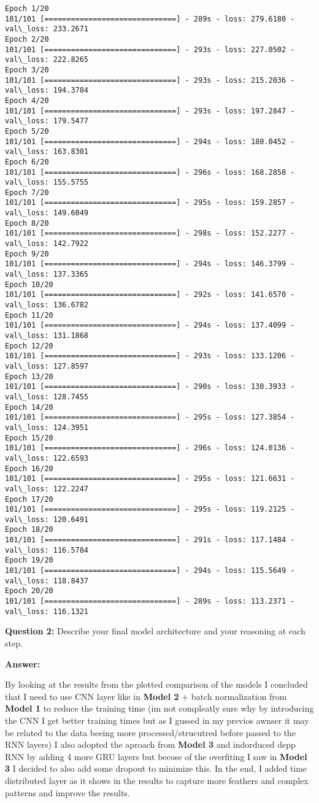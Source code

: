 \documentclass[11pt]{article}
\begin{document}
    \begin{Verbatim}[commandchars=\\\{\}]
Epoch 1/20
101/101 [==============================] - 289s - loss: 279.6180 - val\_loss: 233.2671
Epoch 2/20
101/101 [==============================] - 293s - loss: 227.0502 - val\_loss: 222.8265
Epoch 3/20
101/101 [==============================] - 293s - loss: 215.2036 - val\_loss: 194.3784
Epoch 4/20
101/101 [==============================] - 293s - loss: 197.2847 - val\_loss: 179.5477
Epoch 5/20
101/101 [==============================] - 294s - loss: 180.0452 - val\_loss: 163.8301
Epoch 6/20
101/101 [==============================] - 296s - loss: 168.2858 - val\_loss: 155.5755
Epoch 7/20
101/101 [==============================] - 295s - loss: 159.2857 - val\_loss: 149.6049
Epoch 8/20
101/101 [==============================] - 298s - loss: 152.2277 - val\_loss: 142.7922
Epoch 9/20
101/101 [==============================] - 294s - loss: 146.3799 - val\_loss: 137.3365
Epoch 10/20
101/101 [==============================] - 292s - loss: 141.6570 - val\_loss: 136.6782
Epoch 11/20
101/101 [==============================] - 294s - loss: 137.4099 - val\_loss: 131.1868
Epoch 12/20
101/101 [==============================] - 293s - loss: 133.1206 - val\_loss: 127.8597
Epoch 13/20
101/101 [==============================] - 290s - loss: 130.3933 - val\_loss: 128.7455
Epoch 14/20
101/101 [==============================] - 295s - loss: 127.3854 - val\_loss: 124.3951
Epoch 15/20
101/101 [==============================] - 296s - loss: 124.0136 - val\_loss: 122.6593
Epoch 16/20
101/101 [==============================] - 295s - loss: 121.6631 - val\_loss: 122.2247
Epoch 17/20
101/101 [==============================] - 295s - loss: 119.2125 - val\_loss: 120.6491
Epoch 18/20
101/101 [==============================] - 291s - loss: 117.1484 - val\_loss: 116.5784
Epoch 19/20
101/101 [==============================] - 294s - loss: 115.5649 - val\_loss: 118.8437
Epoch 20/20
101/101 [==============================] - 289s - loss: 113.2371 - val\_loss: 116.1321

    \end{Verbatim}

    \textbf{Question 2:} Describe your final model architecture and your
reasoning at each step.

\textbf{Answer:}

By looking at the results from the plotted comparison of the models I
concluded that I need to use CNN layer like in \textbf{Model 2} + batch
normalization from \textbf{Model 1} to reduce the training time (im not
compleatly sure why by introducing the CNN I get better training times
but as I gussed in my previos awnser it may be related to the data
beeing more processed/strucutred before passed to the RNN layers) I also
adopted the aproach from \textbf{Model 3} and indorduced depp RNN by
adding 4 more GRU layers but becose of the overfiting I saw in
\textbf{Model 3} I decided to also add some dropout to minimize this. In
the end, I added time distributed layer as it shows in the results to
capture more feathers and complex patterns and improve the results.
\end{document}
